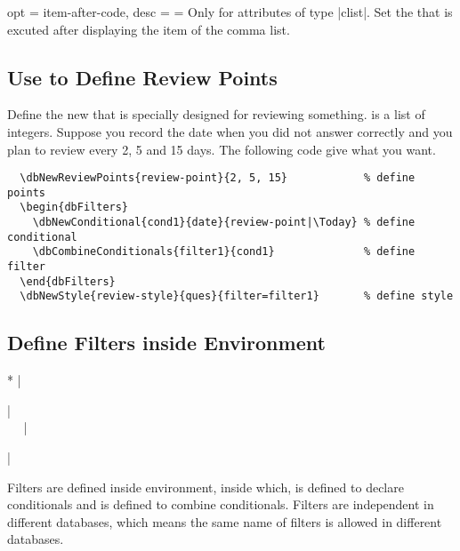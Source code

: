 \documentclass[full]{l3doc}
\begin{document}
\begin{documentation}
\begin{option}{
  opt = item-after-code,
  desc = {= }
}
  Only for attributes of type |clist|. Set the  that is
  excuted after displaying the item of the comma list.
\end{option}

\subsection{Use  to Define Review Points}

\begin{function}{\dbNewReviewPoints}
  \begin{syntax}
      
  \end{syntax}

  Define the new  that is specially designed for reviewing
  something.  is a list of integers. Suppose you record the date
  when you did not answer correctly and you plan to review every 2, 5 and 15
  days. The following code give what you want.
\begin{verbatim}
  \dbNewReviewPoints{review-point}{2, 5, 15}            % define points
  \begin{dbFilters}
    \dbNewConditional{cond1}{date}{review-point|\Today} % define conditional
    \dbCombineConditionals{filter1}{cond1}              % define filter
  \end{dbFilters}
  \dbNewStyle{review-style}{ques}{filter=filter1}       % define style
\end{verbatim}
\end{function}

\subsection{Define Filters inside  Environment}

\noindent{}
\begin{Syntax}*
  |\begin{dbFilters}| \\
  ~~
  |\end{dbFilters}| \\
\end{Syntax}

Filters are defined inside  environment, inside which,
 is defined to declare conditionals and
 is defined to combine conditionals. Filters are
independent in different databases, which means the same name of filters is
allowed in different databases.


\end{documentation}
\end{document}
